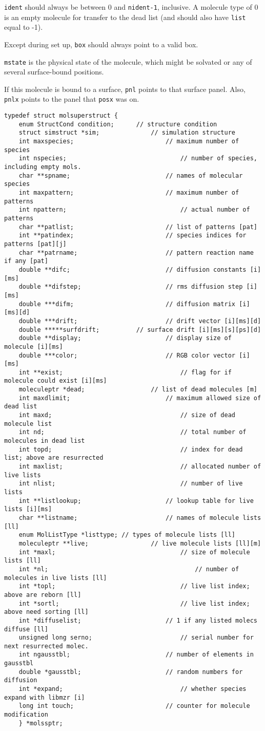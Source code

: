 \documentclass {book}
\begin{document}
\texttt{ident} should always be between 0 and \texttt{nident-1}, inclusive. A molecule type of 0 is an empty molecule for transfer to the dead list (and should also have \texttt{list} equal to -1).

Except during set up, \texttt{box} should always point to a valid box.

\texttt{mstate} is the physical state of the molecule, which might be solvated or any of several surface-bound positions.

If this molecule is bound to a surface, \texttt{pnl} points to that surface panel. Also, \texttt{pnlx} points to the panel that \texttt{posx} was on.

\begin{lstlisting}
typedef struct molsuperstruct {
	enum StructCond condition;		// structure condition
	struct simstruct *sim;				// simulation structure
	int maxspecies;							// maximum number of species
	int nspecies;								// number of species, including empty mols.
	char **spname;							// names of molecular species
	int maxpattern;							// maximum number of patterns
	int npattern;								// actual number of patterns
	char **patlist;							// list of patterns [pat]
	int **patindex;							// species indices for patterns [pat][j]
	char **patrname;						// pattern reaction name if any [pat]
	double **difc;							// diffusion constants [i][ms]
	double **difstep;						// rms diffusion step [i][ms]
	double ***difm;							// diffusion matrix [i][ms][d]
	double ***drift;						// drift vector [i][ms][d]
	double *****surfdrift;			// surface drift [i][ms][s][ps][d]
	double **display;						// display size of molecule [i][ms] 
	double ***color;						// RGB color vector [i][ms]
	int **exist;								// flag for if molecule could exist [i][ms]
	moleculeptr *dead;					// list of dead molecules [m]
	int maxdlimit;							// maximum allowed size of dead list
	int maxd;									// size of dead molecule list
	int nd;										// total number of molecules in dead list
	int topd;									// index for dead list; above are resurrected
	int maxlist;								// allocated number of live lists
	int nlist;									// number of live lists
	int **listlookup;						// lookup table for live lists [i][ms]
	char **listname;						// names of molecule lists [ll]
	enum MolListType *listtype;	// types of molecule lists [ll]
	moleculeptr **live;					// live molecule lists [ll][m]
	int *maxl;									// size of molecule lists [ll]
	int *nl;										// number of molecules in live lists [ll]
	int *topl;									// live list index; above are reborn [ll]
	int *sortl;									// live list index; above need sorting [ll]
	int *diffuselist;						// 1 if any listed molecs diffuse [ll]
	unsigned long serno;						// serial number for next resurrected molec.
	int ngausstbl;							// number of elements in gausstbl
	double *gausstbl;						// random numbers for diffusion
	int *expand;								// whether species expand with libmzr [i]
	long int touch;							// counter for molecule modification
	} *molssptr;
\end{lstlisting}
\end{document}
